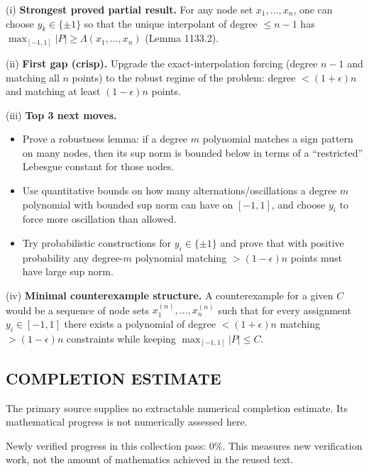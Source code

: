 (i) \textbf{Strongest proved partial result.}
For any node set $x_1,\dots,x_n$, one can choose $y_k\in\{\pm 1\}$ so that the unique interpolant of degree $\le n-1$ has $\max_{[-1,1]}|P|\ge \Lambda(x_1,\dots,x_n)$ (Lemma 1133.2).

(ii) \textbf{First gap (crisp).}
Upgrade the exact-interpolation forcing (degree $n-1$ and matching all $n$ points) to the robust regime of the problem: degree $<(1+\epsilon)n$ and matching at least $(1-\epsilon)n$ points.

(iii) \textbf{Top 3 next moves.}
\begin{itemize}
\item Prove a robustness lemma: if a degree $m$ polynomial matches a sign pattern on many nodes, then its sup norm is bounded below in terms of a ``restricted'' Lebesgue constant for those nodes.
\item Use quantitative bounds on how many alternations/oscillations a degree $m$ polynomial with bounded sup norm can have on $[-1,1]$, and choose $y_i$ to force more oscillation than allowed.
\item Try probabilistic constructions for $y_i\in\{\pm 1\}$ and prove that with positive probability any degree-$m$ polynomial matching $>(1-\epsilon)n$ points must have large sup norm.
\end{itemize}

(iv) \textbf{Minimal counterexample structure.}
A counterexample for a given $C$ would be a sequence of node sets $x^{(n)}_1,\dots,x^{(n)}_n$ such that for every assignment $y_i\in[-1,1]$ there exists a polynomial of degree $<(1+\epsilon)n$ matching $>(1-\epsilon)n$ constraints while keeping $\max_{[-1,1]}|P|\le C$.




\subsection*{COMPLETION ESTIMATE}
The primary source supplies no extractable numerical completion estimate. Its mathematical progress is not numerically assessed here.

Newly verified progress in this collection pass: $0\%$. This measures new verification work, not the amount of mathematics achieved in the reused text.
